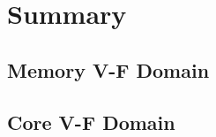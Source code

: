 \section{Summary}


\subsection{Memory V-F Domain}
\label{section:memory}



\subsection{Core V-F Domain}
\label{section:core}